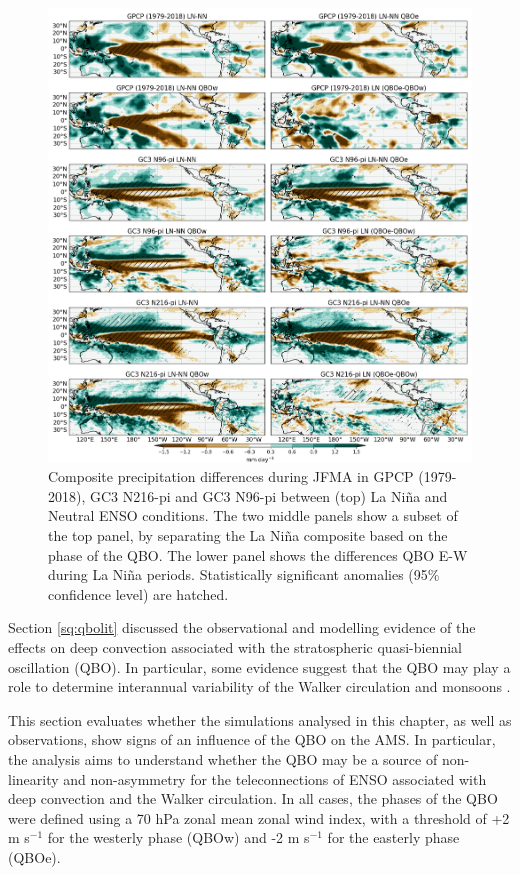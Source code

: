 \begin{figure}[b!]
\includegraphics[width=\linewidth]{figures/trops_qbolnprfma}
\caption{Composite precipitation differences during JFMA in GPCP (1979-2018), GC3 N216-pi and GC3 N96-pi between (top) La Niña and Neutral ENSO conditions. The two middle panels show a subset of the top panel, by separating the La Niña composite based on the phase of the QBO. The lower panel shows the differences QBO E-W during La Niña periods. Statistically significant anomalies (95\% confidence level) are hatched.}
\label{fig:qbopr_pis}
\end{figure}  

Section \ref{sq:qbolit} discussed the observational and modelling evidence of the effects on deep convection associated with the stratospheric quasi-biennial oscillation (QBO). In particular, some evidence suggest that the QBO may play a role to determine interannual variability of the Walker circulation and monsoons \citep{giorgetta1999,collimore2003,liess2012}. 

This section evaluates whether the simulations analysed in this chapter, as well as observations, show signs of an influence of the QBO on the AMS. 
In particular, the analysis aims to understand whether the QBO may be a source of non-linearity and non-asymmetry for the teleconnections of ENSO associated with deep convection and the Walker circulation. In all cases, the phases of the QBO were defined using a 70 hPa zonal mean zonal wind index, with a threshold of +2 m s$^{-1}$ for the westerly phase (QBOw) and -2 m s$^{-1}$ for the easterly phase (QBOe).

